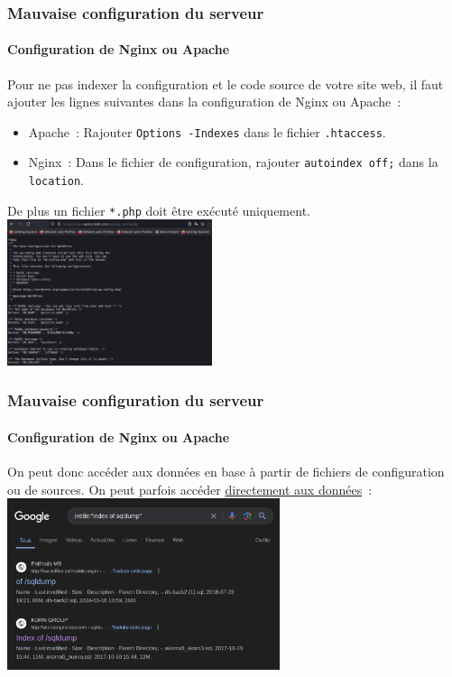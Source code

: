 \documentclass{beamer}
\begin{document}
    \begin{frame}
        \frametitle{Mauvaise configuration du serveur}
        \framesubtitle{Configuration de Nginx ou Apache}
        \transdissolve
        Pour ne pas indexer la configuration et le code source de votre site web, il faut ajouter les lignes suivantes dans la configuration de Nginx ou Apache~:
        \begin{itemize}
            \item Apache~: Rajouter \lstinline{Options -Indexes} dans le fichier \lstinline{.htaccess}.
            \item Nginx~: Dans le fichier de configuration, rajouter \lstinline{autoindex off;} dans la \lstinline{location}.
        \end{itemize}
        De plus un fichier \lstinline{*.php} doit être exécuté uniquement.
        \bigbreak
        \centering
        \includegraphics[width=6cm]{image/php-to-execute}
    \end{frame}

    \begin{frame}
        \frametitle{Mauvaise configuration du serveur}
        \framesubtitle{Configuration de Nginx ou Apache}
        \transdissolve
        On peut donc accéder aux données en base à partir de fichiers de configuration ou de sources.
        \bigbreak
        On peut parfois accéder \href{https://www.google.com/search?q=intitle\%3A\%22index+of+sqldump\%22}{directement aux données}~:
        \bigbreak
        \centering
        \includegraphics[width=8cm]{image/dork-sqldump}
    \end{frame}
\end{document}
